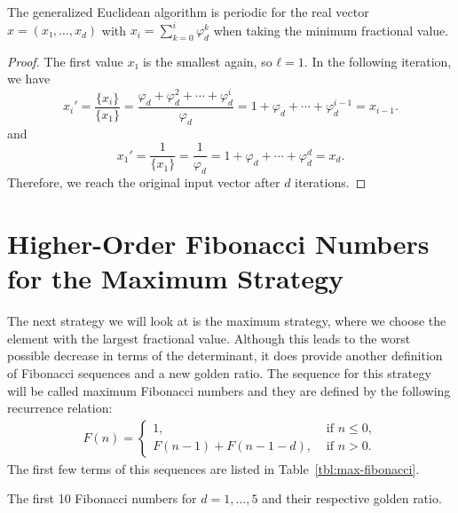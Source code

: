 \begin{theorem}
  The generalized Euclidean algorithm is periodic for the real vector $x = (x₁, …, x_d)$
  with $x_i = \sum_{k=0}^i φ_d^k$ when taking the minimum fractional value.
\end{theorem}

\begin{proof}
  The first value $x₁$ is the smallest again, so $ℓ = 1$.
  In the following iteration, we have
  \[
    x_i' = \frac{\{x_i\}}{\{x_1\}} = \frac{φ_d + φ_d^2 + ⋯ + φ_d^i}{φ_d} = 1 + φ_d + ⋯ + φ_d^{i-1} = x_{i-1}.
  \]
  and
  \[
    x_1' = \frac{1}{\{x_1\}} = \frac{1}{φ_d} = 1 + φ_d + ⋯ + φ_d^d = x_d.
  \]
  Therefore, we reach the original input vector after $d$ iterations.
\end{proof}


\section{Higher-Order Fibonacci Numbers for the Maximum Strategy}

The next strategy we will look at is the maximum strategy,
where we choose the element with the largest fractional value.
Although this leads to the worst possible decrease in terms of the determinant,
it does provide another definition of Fibonacci sequences and a new golden ratio.
The sequence for this strategy will be called maximum Fibonacci numbers and they
are defined by the following recurrence relation:
\begin{align*}
  F(n) =
  \begin{cases}
    1, & \text{ if } n ≤ 0, \\
    F(n - 1) + F(n - 1 - d), & \text{ if } n > 0.
  \end{cases}
\end{align*}
The first few terms of this sequences are listed in Table~\ref{tbl:max-fibonacci}.

\begin{table}[tbp]
  \caption{The first 10 Fibonacci numbers for $d = 1, …, 5$ and their respective golden ratio.}
  \label{tbl:max-fibonacci}
  \centering
  
\end{table}

